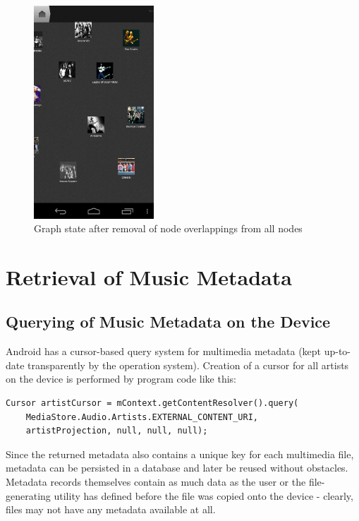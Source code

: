 \begin{figure}[H]
  \centering
    \includegraphics[width=0.4\textwidth]{figures/screen_mds_10_after_all_uncollided_nodes}
  \caption{Graph state after removal of node overlappings from all nodes}
  \label{fig:screen_mds_10_after_all_uncollided_nodes}
\end{figure}

\section{Retrieval of Music Metadata}

\subsection{Querying of Music Metadata on the Device}

Android has a cursor-based query system for multimedia metadata (kept up-to-date transparently by the
operation system). Creation of a cursor for all artists on the device is performed by program code like this:

\begin{verbatim}
Cursor artistCursor = mContext.getContentResolver().query(
	MediaStore.Audio.Artists.EXTERNAL_CONTENT_URI,
    artistProjection, null, null, null);
\end{verbatim}

Since the returned metadata also contains a unique key for each multimedia file, metadata can be
persisted in a database and later be reused without obstacles.
Metadata records themselves contain as much data as the user or the file-generating utility has defined
before the file was copied onto the device - clearly, files may not have any metadata available at all.

